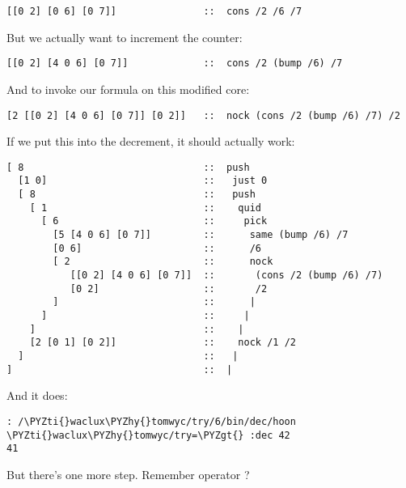 \begin{framed_shaded}
\begin{Verbatim}[fontsize=\relsize{-2.5},fontseries=b,commandchars=\\\{\}]
[[0 2] [0 6] [0 7]]               ::  cons /2 /6 /7
\end{Verbatim}
\end{framed_shaded}
But we actually want to increment the counter:

\begin{framed_shaded}
\begin{Verbatim}[fontsize=\relsize{-2.5},fontseries=b,commandchars=\\\{\}]
[[0 2] [4 0 6] [0 7]]             ::  cons /2 (bump /6) /7
\end{Verbatim}
\end{framed_shaded}
And to invoke our formula on this modified core:

\begin{framed_shaded}
\begin{Verbatim}[fontsize=\relsize{-2.5},fontseries=b,commandchars=\\\{\}]
[2 [[0 2] [4 0 6] [0 7]] [0 2]]   ::  nock (cons /2 (bump /6) /7) /2
\end{Verbatim}
\end{framed_shaded}
If we put this into the decrement, it should actually work:

\begin{framed_shaded}
\begin{Verbatim}[fontsize=\relsize{-2.5},fontseries=b,commandchars=\\\{\}]
[ 8                               ::  push
  [1 0]                           ::   just 0
  [ 8                             ::   push
    [ 1                           ::    quid
      [ 6                         ::     pick
        [5 [4 0 6] [0 7]]         ::      same (bump /6) /7
        [0 6]                     ::      /6
        [ 2                       ::      nock
           [[0 2] [4 0 6] [0 7]]  ::       (cons /2 (bump /6) /7)
           [0 2]                  ::       /2
        ]                         ::      |
      ]                           ::     |
    ]                             ::    |
    [2 [0 1] [0 2]]               ::    nock /1 /2
  ]                               ::   |
]                                 ::  |
\end{Verbatim}
\end{framed_shaded}
And it does:

\begin{framed_shaded}
\begin{Verbatim}[fontsize=\relsize{-2.5},fontseries=b,commandchars=\\\{\}]
: /\PYZti{}waclux\PYZhy{}tomwyc/try/6/bin/dec/hoon
\PYZti{}waclux\PYZhy{}tomwyc/try=\PYZgt{} :dec 42
41
\end{Verbatim}
\end{framed_shaded}
But there's one more step.  Remember operator ?

